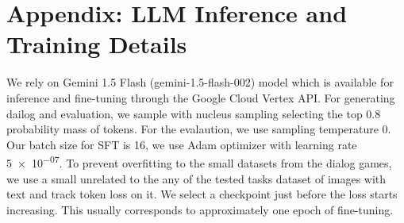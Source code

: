\section{Appendix: LLM Inference and Training Details}
\label{sec:training-details}

We rely on Gemini 1.5 Flash (gemini-1.5-flash-002) model which is available for inference and fine-tuning through the Google Cloud Vertex API.
For generating dailog and evaluation, we sample with nucleus sampling selecting the top \num{0.8} probability mass of tokens.
For the evalaution, we use sampling temperature \num{0}.
Our batch size for SFT is \num{16}, we use Adam optimizer with learning rate \num{5e-07}.
To prevent overfitting to the small datasets from the dialog games, we use a small unrelated to the any of the tested tasks dataset of images with text and track token loss on it.
We select a checkpoint just before the loss starts increasing. 
This usually corresponds to approximately one epoch of fine-tuning.

